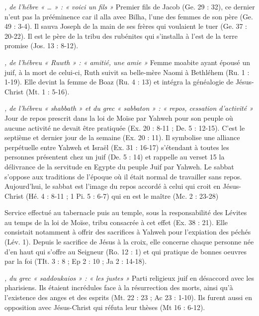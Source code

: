 \begin{multicols}{2}
\textit{, de l’hébre « … » : « voici un fils »}\newline
Premier fils de Jacob (Ge. 29 : 32), ce dernier n'eut pas la prééminence car il alla avec Bilha, l'une des femmes de son père (Ge. 49 : 3-4). Il sauva Joseph de la main de ses frères qui voulaient le tuer (Ge. 37 : 20-22). Il est le père de la tribu des rubénites qui s'installa à l'est de la terre promise (Jos. 13 : 8-12).

\textit{, de l'hébreu « Ruwth » : « amitié, une amie »}\newline
Femme moabite ayant épousé un juif, à la mort de celui-ci, Ruth suivit sa belle-mère Naomi à Bethléhem (Ru. 1 : 1-19). Elle devint la femme de Boaz (Ru. 4 : 13) et intégra la généalogie de Jésus-Christ (Mt. 1 : 5-16).

\textit{, de l'hébreu « shabbath » et du grec « sabbaton » : « repos, cessation d'activité »}\newline
Jour de repos prescrit dans la loi de Moïse par Yahweh pour son peuple où aucune activité ne devait être pratiquée (Ex. 20 : 8-11 ; De. 5 : 12-15). C'est le septième et dernier jour de la semaine (Ex. 20 : 11). Il symbolise une alliance perpétuelle entre Yahweh et Israël (Ex. 31 : 16-17) s'étendant à toutes les personnes présentent chez un juif (De. 5 : 14) et rappelle au verset 15 la délivrance de la servitude en Egypte du peuple Juif par Yahweh. Le sabbat s'oppose aux traditions de l'époque où il était normal de travailler sans repos. Aujourd'hui, le sabbat est l'image du repos accordé à celui qui croit en Jésus-Christ (Hé. 4 : 8-11 ; 1 Pi. 5 : 6-7) qui en est le maître (Mc. 2 : 23-28)

\textit{}\newline
Service effectué au tabernacle puis au temple, sous la responsabilité des Lévites au temps de la loi de Moïse, tribu consacrée à cet effet (Ex. 38 : 21). Elle consistait notamment à offrir des sacrifices à Yahweh pour l'expiation des péchés (Lév. 1). Depuis le sacrifice de Jésus à la croix, elle concerne chaque personne née d'en haut qui s'offre au Seigneur (Ro. 12 : 1) et qui pratique de bonnes oeuvres par la foi (TIt. 3 : 8 ; Ep 2 : 10 ; Ja 2 : 14-18).

\textit{, du grec « saddoukaios » : « les justes »}\newline
Parti religieux juif en désaccord avec les pharisiens. Ils étaient incrédules face à la résurrection des morts, ainsi qu'à l'existence des anges et des esprits (Mt. 22 : 23 ; Ac 23 : 1-10). Ils furent aussi en opposition avec Jésus-Christ qui réfuta leur thèses (Mt 16 : 6-12).


\end{multicols}
